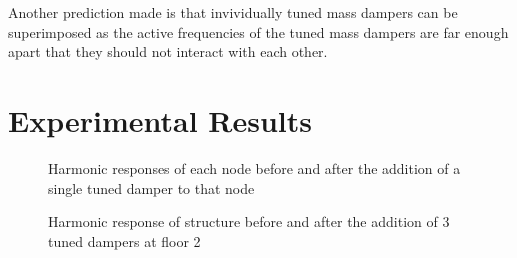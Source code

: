 \documentclass[8pt]{article}
\begin{document}
Another prediction made is that invividually tuned mass dampers can be superimposed as the active frequencies of the tuned mass dampers are
far enough apart that they should not interact with each other.

\vspace{-14pt}
\section{Experimental Results}
\vspace{-14pt}

\begin{figure}[H]
    \centering
    \vspace{-14pt}
    \caption{\label{fig:modes} Harmonic responses of each node before and after the addition of a single tuned damper to that node}
\end{figure}

\begin{figure}[H]
    \vspace{-14pt}
    \caption{\label{fig:combined_full_sweep} Harmonic response of structure before and after the addition of 3 tuned dampers at floor 2}
\end{figure}
\end{document}
